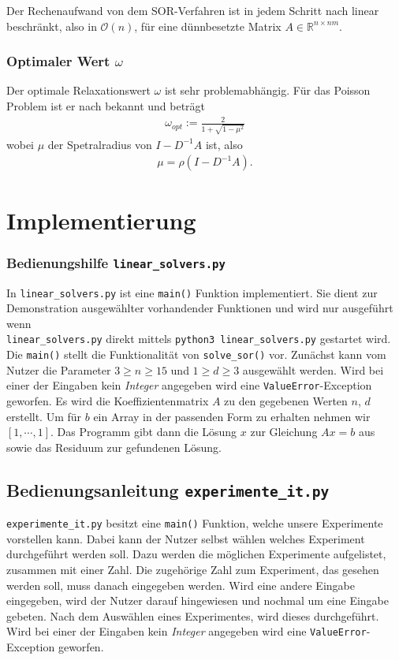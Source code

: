 \documentclass[smallheadings]{scrartcl}
\theoremstyle{definition}
\begin{document}
		Der Rechenaufwand von dem SOR-Verfahren ist in jedem Schritt nach
		 \citep{slides} linear beschränkt, also in $\mathcal{O}(n)$, für eine 
		 dünnbesetzte Matrix $A\in\mathbb{R}^{n\times nm}$.  
		 
		 \subsubsection{Optimaler Wert $\omega$}
		 Der optimale Relaxationswert $\omega$ ist sehr problemabhängig. Für das Poisson Problem ist er nach \citep{slides} bekannt und beträgt
		 \begin{align*}
		 \omega _{opt}:=\frac{2}{1+\sqrt{1-\mu ^2}}
		 \end{align*}
		 wobei $\mu$ der Spetralradius von $I-D^{-1}A$ ist, also 
		 \begin{align*}
		 \mu = \rho (I-D^{-1}A).
		 \end{align*}
		 
		 
		
\section{Implementierung}


\subsubsection*{Bedienungshilfe \texttt{linear\_solvers.py}}
In \texttt{linear\_solvers.py} ist eine \texttt{main()} Funktion implementiert. Sie dient zur Demonstration ausgewählter vorhandender Funktionen und
		wird nur ausgef\"uhrt wenn
		\\ \texttt{linear\_solvers.py} direkt mittels \texttt{python3 linear\_solvers.py} gestartet wird. 
 Die \texttt{main()} stellt die Funktionalität von \texttt{solve\_sor()} vor. Zunächst kann vom Nutzer die Parameter $3\geq n\geq 15$ und $1\geq d\geq 3$ ausgewählt werden. Wird bei einer der Eingaben kein \textit{Integer} angegeben wird eine \texttt{ValueError}-Exception geworfen.
 Es wird die Koeffizientenmatrix $A$ zu den gegebenen Werten $n$, $d$  erstellt. Um für $b$ ein Array in der passenden Form zu erhalten nehmen wir $[1,\cdots,1]$.
 Das Programm gibt dann die Lösung $x$ zur Gleichung $Ax=b$ aus sowie das Residuum zur gefundenen Lösung.

 \subsection*{Bedienungsanleitung \texttt{experimente\_it.py}}
 \texttt{experimente\_it.py} besitzt eine \texttt{main()} Funktion, welche unsere Experimente vorstellen kann. Dabei kann der Nutzer selbst wählen welches Experiment durchgeführt werden soll.
 Dazu werden die möglichen Experimente aufgelistet, zusammen mit einer Zahl. Die zugehörige Zahl zum Experiment, das gesehen werden soll, muss danach eingegeben werden. Wird eine andere Eingabe eingegeben, wird der Nutzer darauf hingewiesen und nochmal um eine Eingabe gebeten. Nach dem Auswählen eines Experimentes, wird dieses durchgeführt.
 Wird bei einer der Eingaben kein \textit{Integer} angegeben wird eine \texttt{ValueError}-Exception geworfen.\\
 \\
\end{document}
